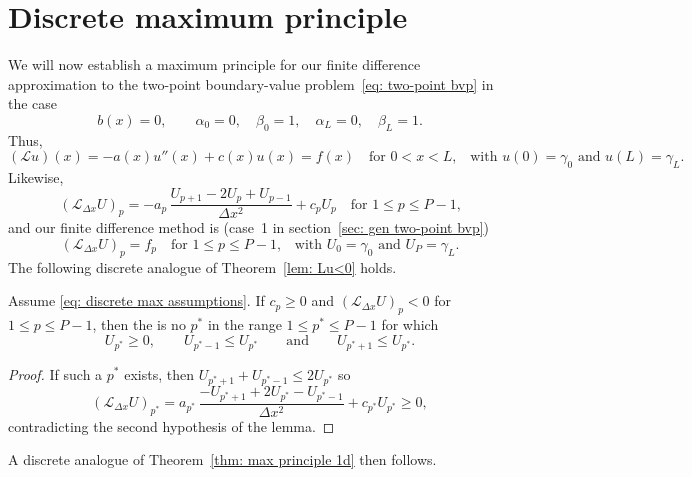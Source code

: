 \section{Discrete maximum principle}

We will now establish a maximum principle for our finite difference 
approximation to the two-point boundary-value problem~\eqref{eq: two-point bvp} 
in the case
\begin{equation}\label{eq: discrete max assumptions}
b(x)=0,\qquad\alpha_0=0,\quad\beta_0=1,\quad\alpha_L=0,\quad\beta_L=1.
\end{equation}
Thus, 
\begin{equation}\label{eq: simple Lu=f}
(\mathcal{L}u)(x)=-a(x)u''(x)+c(x)u(x)=f(x)\quad\text{for~$0<x<L$,}\quad
\text{with $u(0)=\gamma_0$~and $u(L)=\gamma_L$.}
\end{equation}
Likewise,
\[
(\mathcal{L}_{\Delta x}U)_p=-a_p\,\frac{U_{p+1}-2U_p+U_{p-1}}{\Delta x^2}
	+c_pU_p\quad\text{for $1\le p\le P-1$,}
\]
and our finite difference method is (case~1 in 
section~\ref{sec: gen two-point bvp})
\begin{equation}\label{eq: finite diff Dirichlet 1d}
(\mathcal{L}_{\Delta x}U)_p=f_p\quad\text{for $1\le p\le P-1$,}\quad
	\text{with $U_0=\gamma_0$ and $U_P=\gamma_L$.}
\end{equation}
The following discrete analogue of Theorem~\ref{lem: Lu<0} holds.

\begin{lemma}\label{lem: discrete LU<0}
Assume \eqref{eq: discrete max assumptions}.
If $c_p\ge0$ and $(\mathcal{L}_{\Delta x}U)_p<0$ for~$1\le p\le P-1$, then
the is no $p^*$ in the range $1\le p^*\le P-1$ for which
\[
U_{p^*}\ge 0,\qquad U_{p^*-1}\le U_{p^*}\qquad\text{and}\qquad
U_{p^*+1}\le U_{p^*}.
\]
\end{lemma}
\begin{proof}
If such a $p^*$ exists, then $U_{p^*+1}+U_{p^*-1}\le 2U_{p^*}$ so
\[
(\mathcal{L}_{\Delta x}U)_{p^*}
	=a_{p^*}\,\frac{-U_{p^*+1}+2U_{p^*}-U_{p^*-1}}{\Delta x^2}
	+c_{p^*}U_{p^*}\ge 0,
\]
contradicting the second hypothesis of the lemma.
\end{proof}

A discrete analogue of Theorem~\ref{thm: max principle 1d} then follows.

